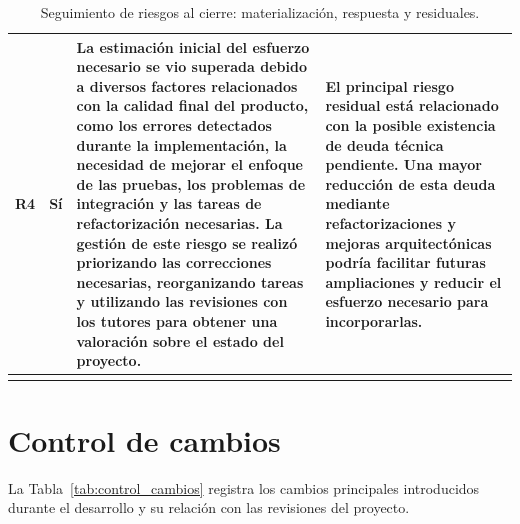 \begin{longtable}{@{}P{0.7cm} P{2.8cm} P{5.4cm} P{5.3cm}@{}}
  R4 &
  Sí &
  La estimación inicial del esfuerzo necesario se vio superada debido a diversos factores relacionados con la calidad final del producto, como los errores detectados durante la implementación, la necesidad de mejorar el enfoque de las pruebas, los problemas de integración y las tareas de refactorización necesarias. La gestión de este riesgo se realizó priorizando las correcciones necesarias, reorganizando tareas y utilizando las revisiones con los tutores para obtener una valoración sobre el estado del proyecto. &
  El principal riesgo residual está relacionado con la posible existencia de deuda técnica pendiente. Una mayor reducción de esta deuda mediante refactorizaciones y mejoras arquitectónicas podría facilitar futuras ampliaciones y reducir el esfuerzo necesario para incorporarlas. \\

  \bottomrule
  \caption{Seguimiento de riesgos al cierre: materialización, respuesta y residuales.}
  \label{tab:seguimiento_riesgos}
\end{longtable}

\section{Control de cambios}
\label{sec:control_cambios}

La Tabla~\ref{tab:control_cambios} registra los cambios principales
introducidos durante el desarrollo y su relación con las revisiones
del proyecto.

